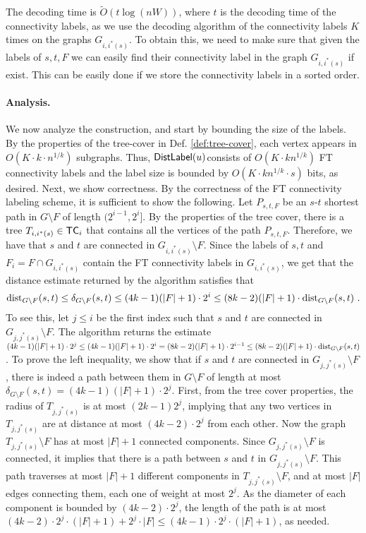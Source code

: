 The decoding time is $\widetilde{O}(t \log{(nW)})$, where $t$ is the decoding time of the connectivity labels, as we use the decoding algorithm of the connectivity labels $K$ times on the graphs $G_{i,i^*(s)}$. To obtain this, we need to make sure that given the labels of $s,t,F$ we can easily find their connectivity label in the graph $G_{i,i^*(s)}$ if exist. This can be easily done if we store the connectivity labels in a sorted order. %

\paragraph{Analysis.}
We now analyze the construction, and start by bounding the size of the labels. By the properties of the tree-cover in Def. \ref{def:tree-cover}, each vertex appears in $O(K \cdot k \cdot n^{1/k})$ subgraphs. Thus, $\mathsf{DistLabel}(u)$consists of $O(K \cdot k n^{1/k})$ FT connectivity labels and the label size is bounded by $O(K \cdot k n^{1/k} \cdot s)$ bits, as desired. Next, we show correctness. By the correctness of the FT connectivity labeling scheme, it is sufficient to show the following. Let $P_{s,t,F}$ be an $s$-$t$ shortest path in $G \setminus F$ of length $(2^{i-1}, 2^{i}]$. By the properties of the tree cover, there is a tree $T_{i,i^*(s)} \in \mathsf{TC}_i$ that contains all the vertices of the path $P_{s,t,F}$. Therefore, we have that $s$ and $t$ are connected in $G_{i,i^*(s)}\setminus F$. Since the labels of $s, t$ and $F_i=F \cap G_{i,i^*(s)}$ contain the FT connectivity labels in $G_{i,i^*(s)}$, we get that the distance estimate returned by the algorithm satisfies that
$$\mbox{\rm dist}_{G \setminus F}(s,t)\leq \delta_{G \setminus F}(s,t) \leq (4k-1)(|F|+1)  \cdot 2^i \leq (8k-2)(|F|+1) \cdot \mbox{\rm dist}_{G \setminus F}(s,t)~.$$
To see this, let $j \leq i$ be the first index such that $s$ and $t$ are connected in $G_{j,j^*(s)}\setminus F$. The algorithm returns the estimate $(4k-1)(|F|+1) \cdot 2^j \leq (4k-1)(|F|+1) \cdot 2^i = (8k-2)(|F|+1) \cdot 2^{i-1} \leq (8k-2)(|F|+1) \cdot \mbox{\rm dist}_{G \setminus F}(s,t)$. To prove the left inequality, we show that if $s$ and $t$ are connected in $G_{j,j^*(s)}\setminus F$, there is indeed a path between them in $G \setminus F$ of length at most $\delta_{G \setminus F}(s,t) = (4k-1)(|F|+1) \cdot 2^j$. First, from the tree cover properties, the radius of $T_{j,j^*(s)}$ is at most $(2k-1)2^j$, implying that any two vertices in $T_{j,j^*(s)}$ are at distance at most $(4k -2) \cdot 2^j$ from each other. Now the graph $T_{j,j^*(s)} \setminus F$ has at most $|F|+1$ connected components. Since $G_{j,j^*(s)}\setminus F$ is connected, it implies that there is a path between $s$ and $t$ in $G_{j,j^*(s)}\setminus F$. This path traverses at most $|F|+1$ different components in $T_{j,j^*(s)} \setminus F$, and at most $|F|$ edges connecting them, each one of weight at most $2^j$. As the diameter of each component is bounded by $(4k - 2) \cdot 2^j$, the length of the path is at most $(4k - 2) \cdot 2^j \cdot (|F|+1) + 2^j \cdot |F| \leq (4k - 1) \cdot 2^j \cdot (|F| + 1)$, as needed.


